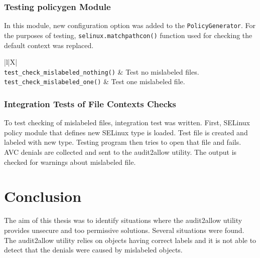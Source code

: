 \subsection{Testing policygen Module}
In this module, new configuration option was added to the
\texttt{PolicyGenerator}. For the purposes of testing,
\texttt{selinux.matchpathcon()} function used for checking the default context
was replaced. 
\begin{longtabu}{|l|X|} \hline
    \\ \hline
    \texttt{test\_check\_mislabeled\_nothing()} & Test no mislabeled files.
    \\ \hline
    \texttt{test\_check\_mislabeled\_one()} & Test one mislabeled file.
    \\ \hline
\end{longtabu}

\subsection{Integration Tests of File Contexts Checks}
To test checking of mislabeled files, integration test was written. First,
SELinux policy module that defines new SELinux type is loaded. Test file is
created and labeled with new type. Testing program then tries to open that
file and fails. AVC denials are collected and sent to the audit2allow utility.
The output is checked for warnings about mislabeled file.

\chapter{Conclusion}


The aim of this thesis was to identify situations where the audit2allow utility
provides unsecure and too permissive solutions. Several situations were found.
The audit2allow utility relies on objects having correct labels and it is not
able to detect that the denials were caused by mislabeled objects.

